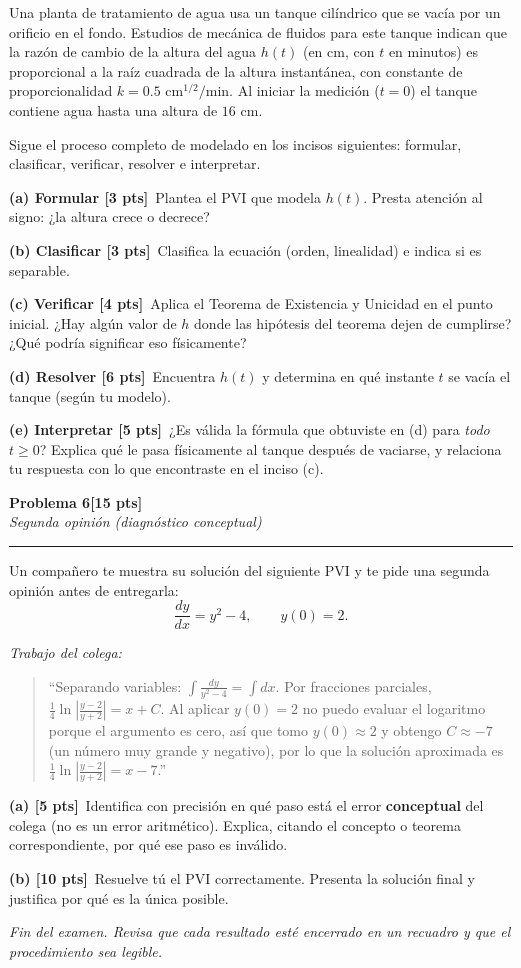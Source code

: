 \documentclass[11pt,letterpaper]{article}
\newcommand{\problema}[3]{%
  \bigskip\bigskip\noindent
  {\Large\textbf{Problema #1}}\hfill\textbf{[#2 pts]}\\[3pt]
  {\small\itshape #3}\par
  \vspace{2pt}\hrule\vspace{8pt}
}
\newcommand{\subparte}[2]{%
  \medskip\noindent\textbf{(#1}\ #2\par
}
\begin{document}
Una planta de tratamiento de agua usa un tanque cilíndrico que se vacía por un orificio en el fondo. Estudios de mecánica de fluidos para este tanque indican que la razón de cambio de la altura del agua $h(t)$ (en cm, con $t$ en minutos) es proporcional a la raíz cuadrada de la altura instantánea, con constante de proporcionalidad $k = 0.5 \text{ cm}^{1/2}/\text{min}$. Al iniciar la medición ($t=0$) el tanque contiene agua hasta una altura de $16$ cm.

Sigue el proceso completo de modelado en los incisos siguientes: formular, clasificar, verificar, resolver e interpretar.

\subparte{a) Formular [3 pts]}{Plantea el PVI que modela $h(t)$. Presta atención al signo: ¿la altura crece o decrece?}

\subparte{b) Clasificar [3 pts]}{Clasifica la ecuación (orden, linealidad) e indica si es separable.}

\subparte{c) Verificar [4 pts]}{Aplica el Teorema de Existencia y Unicidad en el punto inicial. ¿Hay algún valor de $h$ donde las hipótesis del teorema dejen de cumplirse? ¿Qué podría significar eso físicamente?}

\subparte{d) Resolver [6 pts]}{Encuentra $h(t)$ y determina en qué instante $t$ se vacía el tanque (según tu modelo).}

\subparte{e) Interpretar [5 pts]}{¿Es válida la fórmula que obtuviste en (d) para \emph{todo} $t \geq 0$? Explica qué le pasa físicamente al tanque después de vaciarse, y relaciona tu respuesta con lo que encontraste en el inciso (c).}


\problema{6}{15}{Segunda opinión (diagnóstico conceptual)}

Un compañero te muestra su solución del siguiente PVI y te pide una segunda opinión antes de entregarla:
\[
\frac{dy}{dx} = y^2 - 4, \qquad y(0) = 2.
\]

\textit{Trabajo del colega:}
\begin{quote}
\small
``Separando variables: $\displaystyle\int \frac{dy}{y^2-4} = \int dx$. Por fracciones parciales, $\displaystyle \frac{1}{4}\ln\left|\frac{y-2}{y+2}\right| = x + C$. Al aplicar $y(0)=2$ no puedo evaluar el logaritmo porque el argumento es cero, así que tomo $y(0) \approx 2$ y obtengo $C \approx -7$ (un número muy grande y negativo), por lo que la solución aproximada es $\displaystyle\frac{1}{4}\ln\left|\frac{y-2}{y+2}\right| = x - 7$.''
\end{quote}

\subparte{a) [5 pts]}{Identifica con precisión en qué paso está el error \textbf{conceptual} del colega (no es un error aritmético). Explica, citando el concepto o teorema correspondiente, por qué ese paso es inválido.}

\subparte{b) [10 pts]}{Resuelve tú el PVI correctamente. Presenta la solución final y justifica por qué es la única posible.}

\vfill
\begin{center}\small\textit{Fin del examen. Revisa que cada resultado esté encerrado en un recuadro y que el procedimiento sea legible.}\end{center}
\end{document}
